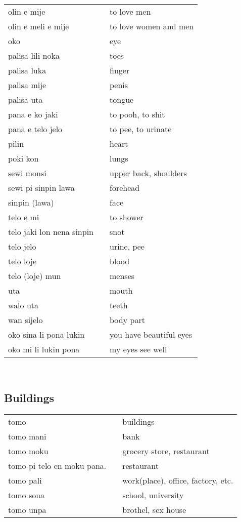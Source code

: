 \begin{supertabular}{p{4,5cm}|ll}
olin e mije && to love men \\
olin e meli e mije && to love women and men \\
oko && eye \\
palisa lili noka && toes \\
palisa luka && finger \\
palisa mije && penis \\
palisa uta && tongue \\
pana e ko jaki && to pooh, to shit \\
pana e telo jelo && to pee, to urinate \\
pilin && heart \\
poki kon && lungs \\
sewi monsi && upper back, shoulders \\
sewi pi sinpin lawa && forehead \\
sinpin (lawa) && face \\
telo e mi && to shower \\
telo jaki lon nena sinpin && snot \\
telo jelo && urine, pee \\
telo loje && blood \\
telo (loje) mun && menses \\
uta && mouth \\
walo uta && teeth \\
wan sijelo && body part \\
oko sina li pona lukin && you have beautiful eyes \\
oko mi li lukin pona && my eyes see well \\
\end{supertabular} \\
%
%
\subsection{Buildings}
%
\begin{supertabular}{p{4,5cm}|ll}
tomo && buildings \\
tomo mani && bank \\
tomo moku && grocery store, restaurant \\
tomo pi telo en moku pana. && restaurant \\
tomo pali && work(place), office, factory, etc. \\
tomo sona && school, university \\
tomo unpa && brothel, sex house \\
\end{supertabular} \\
%
%

